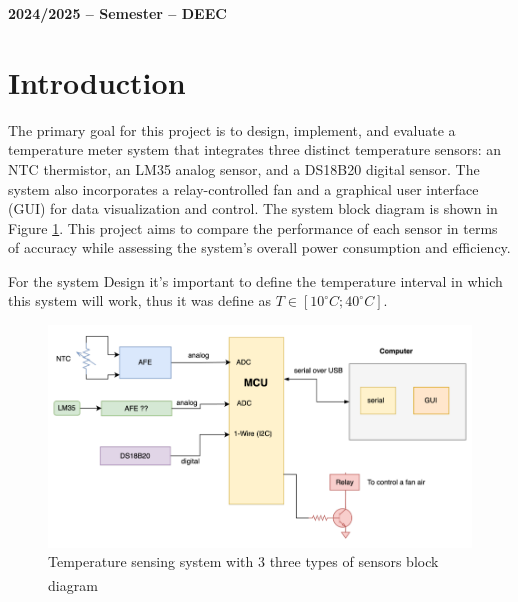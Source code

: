 \documentclass[12pt]{article}
\begin{document}

\vspace{6cm}

\begin{center}
    \large \bf 2024/2025 --  Semester -- DEEC
\end{center}

\thispagestyle{empty}

\setcounter{page}{0}

\newpage

\newpage

\tableofcontents %


\newpage

\listoffigures

\listoftables

\newpage

\section{Introduction}


    The primary goal for this project is to design, implement, and evaluate a temperature meter system that integrates three distinct temperature sensors: an NTC thermistor, an LM35 analog sensor, and a DS18B20 digital sensor. The system also incorporates a relay-controlled fan and a graphical  user interface (GUI) for data visualization and control. The system block diagram is shown in Figure \ref{fig:design-system}. This project aims to compare the performance of each sensor in terms of accuracy while assessing the system's overall power consumption and efficiency.


    \label{requirements}
    For the system Design it's important to define the temperature interval in which this system will work, thus it was define as $ T \in [10^\circ C; 40^\circ C]$. 

   \begin{figure}[H] 
        \centering
        \includegraphics*[scale = 0.5]{images/system-design.png}
        \caption{Temperature sensing system with 3 three types of sensors block diagram\textsuperscript{\cite{lab_statement}}}
        \label{fig:design-system}
    \end{figure}
\end{document}
